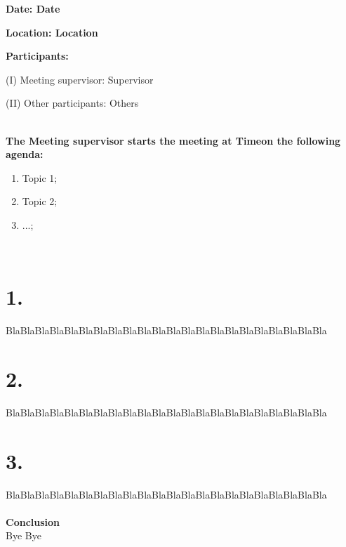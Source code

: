 \documentclass[a4paper, 11pt]{article}
\def \Date {Date}%
\def \Location {Location}%
\def \Supervisor {Supervisor}%
\def \Others {Others}%
\def \Time {Time}%
\begin{document}
\pagestyle{style1}

\textbf{Date: \Date} 

\textbf{Location: \Location}  

\textbf{Participants:} 
\begin{description}
\item (I) Meeting supervisor: \Supervisor
\item (II) Other participants: \Others
\end{description}

\makebox[\linewidth]{\rule{\linewidth}{0.4pt}}\\
\textbf{The Meeting supervisor starts the meeting at \Time on the following agenda:} 
\begin{enumerate}
\item Topic 1;
\item Topic 2;
\item ...;

\end{enumerate}
\makebox[\linewidth]{\rule{\linewidth}{0.4pt}}\\

\section*{1.}
BlaBlaBlaBlaBlaBlaBlaBlaBlaBlaBlaBlaBlaBlaBlaBlaBlaBlaBlaBlaBlaBla
\section*{2. }
BlaBlaBlaBlaBlaBlaBlaBlaBlaBlaBlaBlaBlaBlaBlaBlaBlaBlaBlaBlaBlaBla

\section*{3.}
BlaBlaBlaBlaBlaBlaBlaBlaBlaBlaBlaBlaBlaBlaBlaBlaBlaBlaBlaBlaBlaBla
\\
\\
 \textbf{Conclusion}
 \\
Bye Bye
\end{document}
